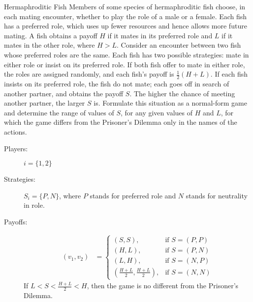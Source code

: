 \documentclass[10pt]{extarticle}
\begin{document}
  \begin{problem}{Hermaphroditic Fish}
    Members of some species of hermaphroditic fish choose, in each mating encounter, whether to play the role of a male or a female. Each fish has a preferred role, which uses up fewer resources and hence allows more future mating. A fish obtains a payoff $H$ if it mates in its preferred role and $L$ if it mates in the other role, where $H>L$. Consider an encounter between two fish whose preferred roles are the same. Each fish has two possible strategies: mate in either role or insist on its preferred role. If both fish offer to mate in either role, the roles are assigned randomly, and each fish's payoff is $\frac{1}{2}(H+L)$. If each fish insists on its preferred role, the fish do not mate; each goes off in search of another partner, and obtains the payoff $S$. The higher the chance of meeting another partner, the larger $S$ is. Formulate this situation as a normal-form game and determine the range of values of $S$, for any given values of $H$ and $L$, for which the game differs from the Prisoner's Dilemma only in the names of the actions.
    \tcblower
    \begin{description}
      \item[Players:] $i = \{1,2\}$
      \item[Strategies:] $S_i = \{P,N\}$, where $P$ stands for preferred role and $N$ stands for neutrality in role.
      \item[Payoffs:]\hfill
        \begin{align*}
          (v_1,v_2) &= \begin{cases}
            (S,S),&\text{if } S = (P,P)\\
            (H,L),&\text{if } S = (P,N)\\
            (L,H),&\text{if } S = (N,P)\\
            (\frac{H+L}{2},\frac{H+L}{2}),&\text{if } S = (N,N)
          \end{cases}
        \end{align*}
        If $L < S < \frac{H+L}{2} < H$, then the game is no different from the Prisoner's Dilemma.
    \end{description}
  \end{problem}
\end{document}
